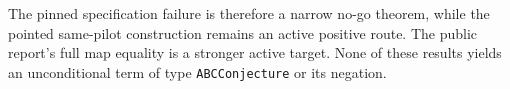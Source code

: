 The pinned specification failure is therefore a narrow no-go theorem, while
the pointed same-pilot construction remains an active positive route.  The
public report's full map equality is a stronger active target.  None of these
results yields an unconditional term of type \texttt{ABCConjecture} or its
negation.
